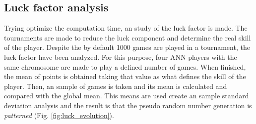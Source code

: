 	\subsection{Luck factor analysis} %
	\label{sub:luck_factor_analysis}
	Trying optimize the computation time, an study of the luck factor is made. 
	The tournaments are made to reduce the luck component and determine the real skill of the player.
	Despite the by default 1000 games are played in a tournament, the luck factor have been analyzed.
	For this purpose, four ANN players with the same chromosome are made to play a defined number of games.
	When finished, the mean of points is obtained taking that value as what defines the skill of the player.
	Then, an sample of games is taken and its mean is calculated and compared with the global mean.
	This means are used create an sample standard deviation analysis and the result is that the pseudo random number generation is \emph{patterned} (Fig. \ref{fig:luck_evolution}).
